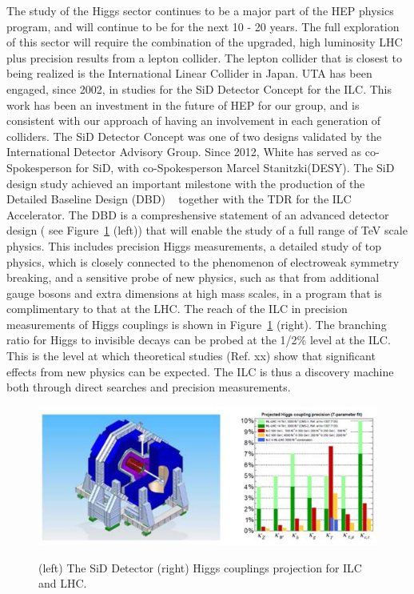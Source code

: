 The study of the Higgs sector continues to be a major part of the HEP physics program, and will continue to be for 
the next 10 - 20 years.
The full exploration of this sector will require the combination of the upgraded, high luminosity LHC plus precision
results from a lepton collider. The lepton collider that is closest to being realized is the International Linear Collider
in Japan. UTA has been engaged, since 2002, in studies for the SiD Detector Concept for the ILC. 
This work has been an investment in the future of HEP for our group, and is 
consistent with our approach of having an involvement in each generation of colliders. The SiD Detector Concept
was one of two designs validated by the International Detector Advisory Group.
Since 2012, White has served as co-Spokesperson for SiD, with co-Spokesperson Marcel Stanitzki(DESY).
The SiD design study achieved an important milestone with the production of the Detailed Baseline 
Design (DBD) ~\cite{SiDDBD} together with the TDR for the ILC Accelerator. 
The DBD is a compreshensive statement of an advanced detector design ( see Figure~\ref{fig:SiD_Detector} (left)) that will
enable the study of a full range of TeV scale physics. This includes precision Higgs 
measurements, a detailed study of top physics, which is closely connected to the
phenomenon of electroweak symmetry breaking, and a sensitive probe of new physics, such as that from 
additional gauge bosons and extra dimensions at high mass scales, in a program that is complimentary
to that at the LHC. The reach of the ILC in precision measurements of Higgs couplings is shown in 
Figure~\ref{fig:SiD_Detector} (right). The branching ratio for Higgs to invisible decays can be probed at the 1/2\% level 
at the ILC. This is the level at which theoretical studies (Ref. xx) show that significant effects from new physics can be expected.
The ILC is thus a discovery machine both through direct searches and precision measurements.

\begin{figure}[htb]
\centering

      \includegraphics[scale=0.8]{images/SiD_Detector_ILC_Higgs.JPG}
      \label{fig:SiD_Detector}

\caption{(left) The SiD Detector (right) Higgs couplings projection for ILC and LHC.}
\end{figure}

